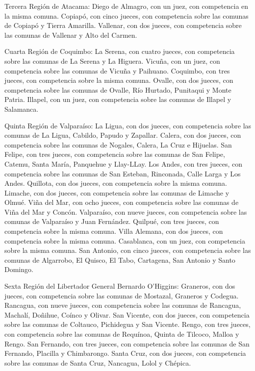     Tercera Región de Atacama:
    Diego de Almagro, con un juez, con competencia en la misma comuna.
    Copiapó, con cinco jueces, con competencia sobre las comunas de Copiapó y Tierra Amarilla.
    Vallenar, con dos jueces, con competencia sobre las comunas de Vallenar y Alto del Carmen.

    Cuarta Región de Coquimbo:
    La Serena, con cuatro jueces, con competencia sobre las comunas de La Serena y La Higuera.
    Vicuña, con un juez, con competencia sobre las comunas de Vicuña y Paihuano.
    Coquimbo, con tres jueces, con competencia sobre la misma comuna.
    Ovalle, con dos jueces, con competencia sobre las comunas de Ovalle, Río Hurtado, Punitaqui y Monte Patria.
    Illapel, con un juez, con competencia sobre las comunas de Illapel y Salamanca.

    Quinta Región de Valparaíso:
    La Ligua, con dos jueces, con competencia sobre las comunas de La Ligua, Cabildo, Papudo y Zapallar.
    Calera, con dos jueces, con competencia sobre las comunas de Nogales, Calera, La Cruz e Hijuelas.
    San Felipe, con tres jueces, con competencia sobre las comunas de San Felipe, Catemu, Santa María, Panquehue y Llay-LLay.
    Los Andes, con tres jueces, con competencia sobre las comunas de San Esteban, Rinconada, Calle Larga y Los Andes.
    Quillota, con dos jueces, con competencia sobre la misma comuna.
    Limache, con dos jueces, con competencia sobre las comunas de Limache y Olmué.
    Viña del Mar, con ocho jueces, con competencia sobre las comunas de Viña del Mar y Concón.
    Valparaíso, con nueve jueces, con competencia sobre las comunas de Valparaíso y Juan Fernández.
    Quilpué, con tres jueces, con competencia sobre la misma comuna.
    Villa Alemana, con dos jueces, con competencia sobre la misma comuna.
    Casablanca, con un juez, con competencia sobre la misma comuna.
    San Antonio, con cinco jueces, con competencia sobre las comunas de Algarrobo, El Quisco, El Tabo, Cartagena, San Antonio y Santo Domingo.

    Sexta Región del Libertador General Bernardo O'Higgins:
    Graneros, con dos jueces, con competencia sobre las comunas de Mostazal, Graneros y Codegua.
    Rancagua, con nueve jueces, con competencia sobre las comunas de Rancagua, Machalí, Doñihue, Coínco y Olivar.
    San Vicente, con dos jueces, con competencia sobre las comunas de Coltauco, Pichidegua y San Vicente.
    Rengo, con tres jueces, con competencia sobre las comunas de Requínoa, Quinta de Tilcoco, Malloa y Rengo.
    San Fernando, con tres jueces, con competencia sobre las comunas de San Fernando, Placilla y Chimbarongo.
    Santa Cruz, con dos jueces, con competencia sobre las comunas de Santa Cruz, Nancagua, Lolol y Chépica.

